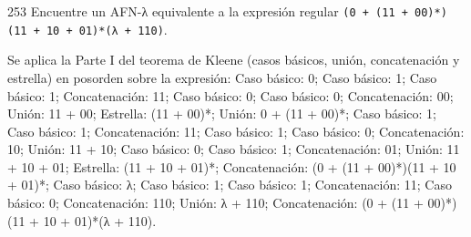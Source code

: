 \documentclass[11pt]{article}
\begin{document}
\begin{ejercicio}{253}{}
Encuentre un AFN-λ equivalente a la expresión regular \texttt{(0 + (11 + 00)*)(11 + 10 + 01)*(λ + 110)}.
\end{ejercicio}
\proc Se aplica la Parte I del teorema de Kleene (casos básicos, unión, concatenación y estrella) en posorden sobre la expresión: Caso básico: 0; Caso básico: 1; Caso básico: 1; Concatenación: 11; Caso básico: 0; Caso básico: 0; Concatenación: 00; Unión: 11 + 00; Estrella: (11 + 00)*; Unión: 0 + (11 + 00)*; Caso básico: 1; Caso básico: 1; Concatenación: 11; Caso básico: 1; Caso básico: 0; Concatenación: 10; Unión: 11 + 10; Caso básico: 0; Caso básico: 1; Concatenación: 01; Unión: 11 + 10 + 01; Estrella: (11 + 10 + 01)*; Concatenación: (0 + (11 + 00)*)(11 + 10 + 01)*; Caso básico: λ; Caso básico: 1; Caso básico: 1; Concatenación: 11; Caso básico: 0; Concatenación: 110; Unión: λ + 110; Concatenación: (0 + (11 + 00)*)(11 + 10 + 01)*(λ + 110).
\end{document}
